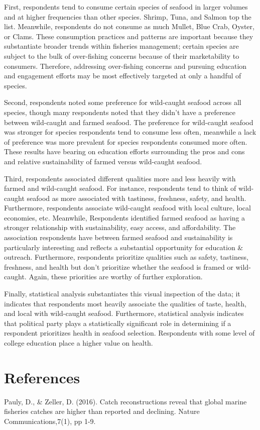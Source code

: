 \documentclass[
  12pt,
]{article}
\begin{document}
First, respondents tend to consume certain species of seafood in larger
volumes and at higher frequencies than other species. Shrimp, Tuna, and
Salmon top the list. Meanwhile, respondents do not consume as much
Mullet, Blue Crab, Oyster, or Clams. These consumption practices and
patterns are important because they substantiate broader trends within
fisheries management; certain species are subject to the bulk of
over-fishing concerns because of their marketability to consumers.
Therefore, addressing over-fishing concerns and pursuing education and
engagement efforts may be most effectively targeted at only a handful of
species.

Second, respondents noted some preference for wild-caught seafood across
all species, though many respondents noted that they didn't have a
preference between wild-caught and farmed seafood. The preference for
wild-caught seafood was stronger for species respondents tend to consume
less often, meanwhile a lack of preference was more prevalent for
species respondents consumed more often. These results have bearing on
education efforts surrounding the pros and cons and relative
sustainability of farmed versus wild-caught seafood.

Third, respondents associated different qualities more and less heavily
with farmed and wild-caught seafood. For instance, respondents tend to
think of wild-caught seafood as more associated with tastiness,
freshness, safety, and health. Furthermore, respondents associate
wild-caught seafood with local culture, local economies, etc. Meanwhile,
Respondents identified farmed seafood as having a stronger relationship
with sustainability, easy access, and affordability. The association
respondents have between farmed seafood and sustainability is
particularly interesting and reflects a substantial opportunity for
education \& outreach. Furthermore, respondents prioritize qualities
such as safety, tastiness, freshness, and health but don't prioritize
whether the seafood is framed or wild-caught. Again, these priorities
are worthy of further exploration.

Finally, statistical analysis substantiates this visual inspection of
the data; it indicates that respondents most heavily associate the
qualities of taste, health, and local with wild-caught seafood.
Furthermore, statistical analysis indicates that political party plays a
statistically significant role in determining if a respondent
prioritizes health in seafood selection. Respondents with some level of
college education place a higher value on health.

\newpage

\hypertarget{references}{%
\section{References}\label{references}}

Pauly, D., \& Zeller, D. (2016). Catch reconstructions reveal that
global marine fisheries catches are higher than reported and declining.
Nature Communications,7(1), pp 1-9.
\end{document}
